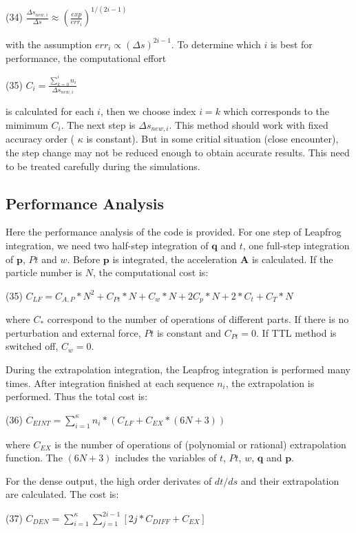 (34) $ \frac{\Delta s_{new,i}}{\Delta s} \approx \left(\frac{exp}{err_{i}}\right)^{1/(2i-1)} $

with the assumption $ err_i \propto (\Delta s)^{2i-1} $. To determine which $ i$ is best for performance, the computational effort

(35) $ C_i = \frac{\sum_{k=0}^i n_i}{\Delta s_{new,i}} $

is calculated for each $ i $, then we choose index $ i=k $ which corresponds to the mimimum $ C_i $. The next step is $ \Delta s_{new,i} $. This method should work with fixed accuracy order ( $ \kappa $ is constant). But in some critial situation (close encounter), the step change may not be reduced enough to obtain accurate results. This need to be treated carefully during the simulations.\hypertarget{index_perf_sec}{}\subsection{Performance Analysis}\label{index_perf_sec}
Here the performance analysis of the code is provided. For one step of Leapfrog integration, we need two half-\/step integration of $ \mathbf{q} $ and $ t $, one full-\/step integration of $ \mathbf{p} $, $ Pt $ and $ w $. Before $ \mathbf{p} $ is integrated, the acceleration $ \mathbf{A} $ is calculated. If the particle number is $ N $, the computational cost is\+:

(35) $ C_{LF} = C_{A,P}*N^2 + C_{Pt}*N + C_{w}*N + 2C_{p}*N + 2*C_{t} + C_{T}*N $

where $ C_* $ correspond to the number of operations of different parts. If there is no perturbation and external force, $ Pt $ is constant and $ C_{Pt} = 0$. If T\+TL method is switched off, $ C_{w} = 0$.

During the extrapolation integration, the Leapfrog integration is performed many times. After integration finished at each sequence $ n_i $, the extrapolation is performed. Thus the total cost is\+:

(36) $ C_{EINT} = \sum_{i=1}^\kappa n_i*(C_{LF} + C_{EX}*(6N+3))$

where $ C_{EX} $ is the number of operations of (polynomial or rational) extrapolation function. The $ (6N+3) $ includes the variables of $ t $, $ Pt $, $ w $, $ \mathbf{q} $ and $ \mathbf{p} $.

For the dense output, the high order derivates of $ dt/ds $ and their extrapolation are calculated. The cost is\+:

(37) $ C_{DEN} = \sum_{i=1}^\kappa \sum_{j=1}^{2i-1} [2j*C_{DIFF} + C_{EX}] $

